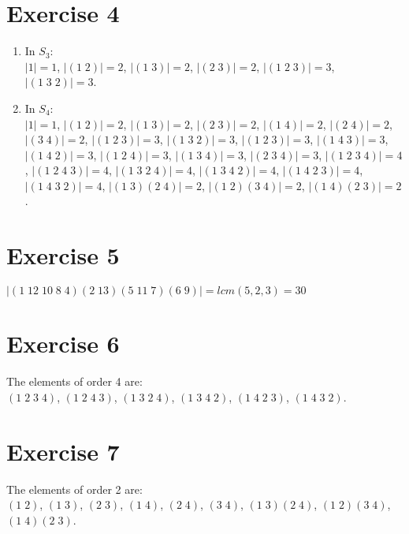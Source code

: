 \documentclass{article}
\begin{document}
    \section*{Exercise 4}
    \begin{enumerate}[label=\textbf{\alph*.}]
        \item 
            In $S_3$: \\
            $|1| = 1$,
            $|(1\;2)| = 2$,
            $|(1\;3)| = 2$,
            $|(2\;3)| = 2$,
            $|(1\;2\;3)| = 3$,
            $|(1\;3\;2)| = 3$.
        \item 
            In $S_4$: \\
            $|1| = 1$,
            $|(1\;2)| = 2$,
            $|(1\;3)| = 2$,
            $|(2\;3)| = 2$,
            $|(1\;4)| = 2$,
            $|(2\;4)| = 2$,
            $|(3\;4)| = 2$,
            $|(1\;2\;3)| = 3$,
            $|(1\;3\;2)| = 3$,
            $|(1\;2\;3)| = 3$,
            $|(1\;4\;3)| = 3$,
            $|(1\;4\;2)| = 3$,
            $|(1\;2\;4)| = 3$,
            $|(1\;3\;4)| = 3$,
            $|(2\;3\;4)| = 3$,
            $|(1\;2\;3\;4)| = 4$,
            $|(1\;2\;4\;3)| = 4$,
            $|(1\;3\;2\;4)| = 4$,
            $|(1\;3\;4\;2)| = 4$,
            $|(1\;4\;2\;3)| = 4$,
            $|(1\;4\;3\;2)| = 4$,
            $|(1\;3)(2\;4)| = 2$,
            $|(1\;2)(3\;4)| = 2$,
            $|(1\;4)(2\;3)| = 2$.
    \end{enumerate}   


    \section*{Exercise 5}
    $|(1\;12\;10\;8\;4)(2\;13)(5\;11\;7)(6\;9)| = lcm(5, 2, 3) = 30$


    \section*{Exercise 6}
    The elements of order 4 are: \\
    $(1\;2\;3\;4)$,
    $(1\;2\;4\;3)$,
    $(1\;3\;2\;4)$,
    $(1\;3\;4\;2)$,
    $(1\;4\;2\;3)$,
    $(1\;4\;3\;2)$.


    \section*{Exercise 7}
    The elements of order 2 are: \\
    $(1\;2)$,
    $(1\;3)$,
    $(2\;3)$,
    $(1\;4)$,
    $(2\;4)$,
    $(3\;4)$,
    $(1\;3)(2\;4)$,
    $(1\;2)(3\;4)$,
    $(1\;4)(2\;3)$.
\end{document}
